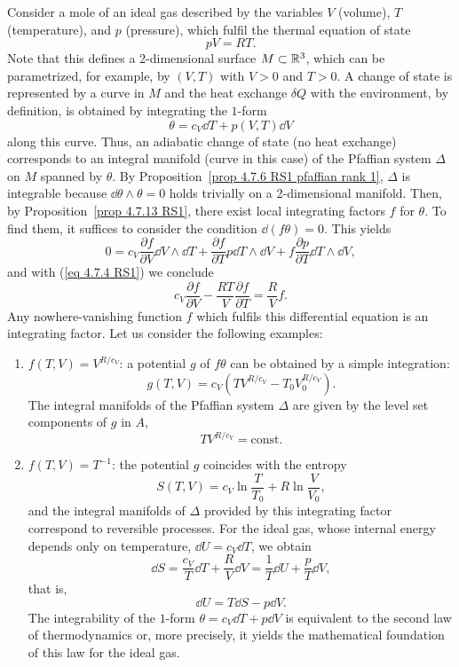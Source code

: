 \begin{example}
    Consider a mole of an ideal gas described by the variables $V$ (volume), $T$ (temperature), and $p$ (pressure), which fulfil the thermal equation of state
    \[pV=RT.\label{eq 4.7.4 RS1}\]
    Note that this defines a 2-dimensional surface $M\subset \mathbb{R}^3$, which can be parametrized, for example, by $(V,T)$ with $V>0$ and $T>0$. A change of state is represented by a curve in $M$ and the heat exchange $\delta Q$ with the environment, by definition, is obtained by integrating the $1$-form
    \[\theta=c_V\dd T+p(V,T)\dd V\]
    along this curve. Thus, an adiabatic change of state (no heat exchange) corresponds to an integral manifold (curve in this case) of the Pfaffian system $\Delta$ on $M$ spanned by $\theta$. By Proposition~\ref{prop 4.7.6 RS1 pfaffian rank 1}, $\Delta$ is integrable because $\dd\theta\wedge\theta=0$ holds trivially on a 2-dimensional manifold. Then, by Proposition~\ref{prop 4.7.13 RS1}, there exist local integrating factors $f$ for $\theta$. To find them, it suffices to consider the condition $\dd(f\theta)=0$. This yields
    \[0=c_V\frac{\partial f}{\partial V}\dd V\wedge \dd T+\frac{\partial f}{\partial T}p\dd T\wedge \dd V+f\frac{\partial p}{\partial T}\dd T\wedge \dd V,\]
    and with (\ref{eq 4.7.4 RS1}) we conclude
    \[c_V\frac{\partial f}{\partial V}-\frac{RT}{V}\frac{\partial f}{\partial T}=\frac RV f.\]
    Any nowhere-vanishing function $f$ which fulfils this differential equation is an integrating factor. Let us consider the following examples:
    \begin{enumerate}
        \item $f(T,V)=V^{R/c_V}$: a potential $g$ of $f\theta$ can be obtained by a simple integration:
        \[g(T,V)=c_V\left(TV^{R/c_V}-T_0V_0^{R/c_V}\right).\]
        The integral manifolds of the Pfaffian system $\Delta$ are given by the level set components of $g$ in $A$, 
        \[TV^{R/c_V}=\mathrm{const}.\]
        \item $f(T,V)=T^{-1}$: the potential $g$ coincides with the entropy
        \[S(T,V)=c_V\ln\frac{T}{T_0}+R\ln\frac{V}{V_0},\]
        and the integral manifolds of $\Delta$ provided by this integrating factor correspond to reversible processes. For the ideal gas, whose internal energy depends only on temperature, $\dd U=c_V\dd T$, we obtain
        \[\dd S=\frac{c_V}{T}\dd T+\frac{R}{V}\dd V=\frac{1}{T}\dd U+\frac{p}{T}\dd V,\]
        that is,
        \[\dd U=T\dd S-p \dd V.\]
        The integrability of the $1$-form $\theta=c_V\dd T+p\dd V$ is equivalent to the second law of thermodynamics or, more precisely, it yields the mathematical foundation of this law for the ideal gas.
    \end{enumerate}
\end{example}




